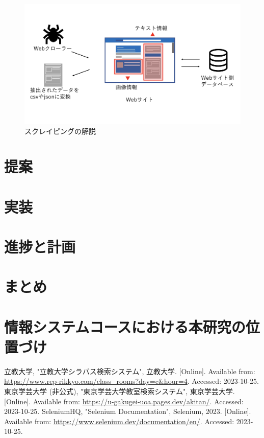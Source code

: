 \documentclass[11pt]{ujarticle}
\begin{document}
\begin{figure}[h]
	\includegraphics[width=0.9\linewidth]{./src/selenium.png}
	\caption{スクレイピングの解説}
  \label{fig:arch}
\end{figure}

\section{提案}



\section{実装}


\section{進捗と計画}


\section{まとめ}


\section{情報システムコースにおける本研究の位置づけ}


\begin{thebibliography}{99}
	立教大学, "立教大学シラバス検索システム", 立教大学. [Online]. Available from: \url{https://www.rep-rikkyo.com/class_rooms?day=c&hour=4}. Accessed: 2023-10-25.
	東京学芸大学 (非公式), "東京学芸大学教室検索システム", 東京学芸大学. [Online]. Available from: \url{https://u-gakugei-uoa.pages.dev/akitan/}. Accessed: 2023-10-25.
	SeleniumHQ, "Selenium Documentation", Selenium, 2023. [Online]. Available from: \url{https://www.selenium.dev/documentation/en/}. Accessed: 2023-10-25.
\end{thebibliography}
\end{document}

